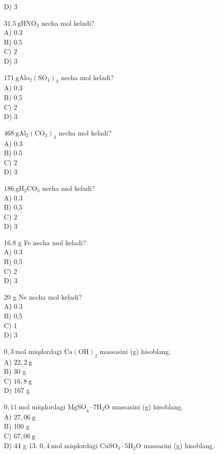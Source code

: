 D) 3
  \item $31.5 \mathrm{~g} \mathrm{HNO}_{3}$ necha mol keladi?\\
A) 0.3\\
B) 0.5\\
C) 2\\
D) 3
  \item $171 \mathrm{~g} \mathrm{Alo}_{2}\left(\mathrm{SO}_{4}\right)_{3}$ necha mol keladi?\\
A) 0,3\\
B) 0,5\\
C) 2\\
D) 3
  \item $468 \mathrm{~g} \mathrm{Al}_{2}\left(\mathrm{CO}_{3}\right)_{3}$ necha mol keladi?\\
A) 0.3\\
B) 0.5\\
C) 2\\
D) 3
  \item $186 \mathrm{~g} \mathrm{H}_{2} \mathrm{CO}_{3}$ necha mol keladi?\\
A) 0,3\\
B) 0,5\\
C) 2\\
D) 3
  \item 16.8 g Fe necha mol keladi?\\
A) 0.3\\
B) 0,5\\
C) 2\\
D) 3
  \item 20 g Ne necha mol keladi?\\
A) 0.3\\
B) 0,5\\
C) 1\\
D) 3
  \item $0,3 \mathrm{~mol}$ miqdordagi $\mathrm{Ca}(\mathrm{OH})_{2}$ massasini (g) hisoblang.\\
A) $22,2 \mathrm{~g}$\\
B) 30 g\\
C) $16,8 \mathrm{~g}$\\
D) 167 g
  \item $0,11 \mathrm{~mol}$ miqdordagi $\mathrm{MgSO}_{4} \cdot 7 \mathrm{H}_{2} \mathrm{O}$ massasini (g) hisoblang.\\
A) $27,06 \mathrm{~g}$\\
B) 100 g\\
C) $67,06 \mathrm{~g}$\\
D) 44 g 13. $0,4 \mathrm{~mol}$ miqdordagi $\mathrm{CuSO}_{4} \cdot 5 \mathrm{H}_{2} \mathrm{O}$ massasini (g) hisoblang.\\
